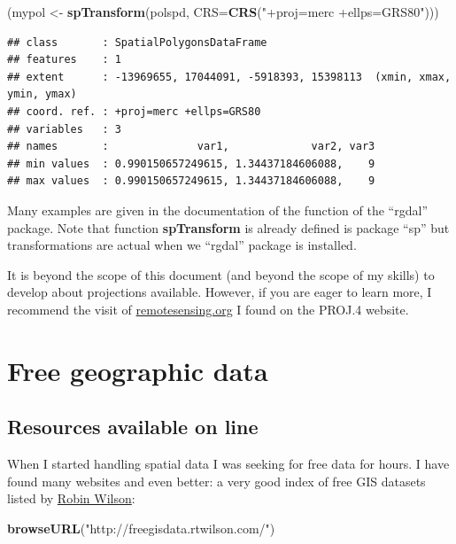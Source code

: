 \documentclass[]{report}
\newenvironment{Shaded}{\begin{snugshade}}{\end{snugshade}}
\newcommand{\KeywordTok}[1]{\textcolor[rgb]{0.13,0.29,0.53}{\textbf{{#1}}}}
\newcommand{\DataTypeTok}[1]{\textcolor[rgb]{0.13,0.29,0.53}{{#1}}}
\newcommand{\StringTok}[1]{\textcolor[rgb]{0.31,0.60,0.02}{{#1}}}
\newcommand{\NormalTok}[1]{{#1}}
\begin{document}
\begin{Shaded}
\begin{Highlighting}[]
\NormalTok{(mypol <-}\StringTok{ }\KeywordTok{spTransform}\NormalTok{(polspd, }\DataTypeTok{CRS=}\KeywordTok{CRS}\NormalTok{(}\StringTok{"+proj=merc +ellps=GRS80"}\NormalTok{)))}
\end{Highlighting}
\end{Shaded}

\begin{verbatim}
## class       : SpatialPolygonsDataFrame 
## features    : 1 
## extent      : -13969655, 17044091, -5918393, 15398113  (xmin, xmax, ymin, ymax)
## coord. ref. : +proj=merc +ellps=GRS80 
## variables   : 3
## names       :              var1,             var2, var3 
## min values  : 0.990150657249615, 1.34437184606088,    9 
## max values  : 0.990150657249615, 1.34437184606088,    9
\end{verbatim}

Many examples are given in the documentation of the function of the
``rgdal'' package. Note that function \textbf{spTransform} is already
defined is package ``sp'' but transformations are actual when we
``rgdal'' package is installed.

It is beyond the scope of this document (and beyond the scope of my
skills) to develop about projections available. However, if you are
eager to learn more, I recommend the visit of
\href{http://www.remotesensing.org/geotiff/proj_list/}{remotesensing.org}
I found on the PROJ.4 website.

\chapter{Free geographic data}\label{free-geographic-data}

\section{Resources available on line}\label{resources-available-on-line}

When I started handling spatial data I was seeking for free data for
hours. I have found many websites and even better: a very good index of
free GIS datasets listed by
\href{http://freegisdata.rtwilson.com/}{Robin Wilson}:

\begin{Shaded}
\begin{Highlighting}[]
\KeywordTok{browseURL}\NormalTok{(}\StringTok{"http://freegisdata.rtwilson.com/"}\NormalTok{)}
\end{Highlighting}
\end{Shaded}
\end{document}
